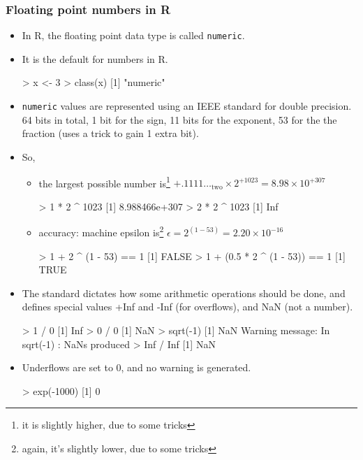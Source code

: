 \documentclass[11pt,a4paper]{article}
\begin{document}
\begin{frame}[fragile]
	\frametitle{Floating point numbers in R}

	\begin{itemize}
    \item <1->In R, the floating point data type is called \texttt{numeric}.
		\item <2->It is the default for numbers in R.
\begin{semiverbatim}
> x <- 3
> class(x)
[1] "numeric"
\end{semiverbatim}
    \item <3->\texttt{numeric} values are represented using an IEEE standard for double precision.  64 bits in total, 1 bit for the sign, 11 bits for the exponent, 53 for the the fraction (uses a trick to gain 1 extra bit).
	\end{itemize}
\end{frame}
\begin{frame}[fragile]
	\begin{itemize}
    \item So,
    \begin{itemize}
        \item <2-> the largest possible number is\footnote{it is slightly higher, due to some tricks}
         $+.1111\ldots_{\mbox{two}} \times 2^{+1023} = 8.98\times 10^{+307}$
\begin{semiverbatim}
> 1 * 2 ^ 1023
[1] 8.988466e+307
> 2 * 2 ^ 1023
[1] Inf\end{semiverbatim}
        \item <3-> accuracy: machine epsilon is\footnote{again, it's slightly lower, due to some tricks} $\epsilon = 2^{(1-53)} = 2.20\times 10^{-16}$
\begin{semiverbatim}
> 1 + 2 ^ (1 - 53) == 1
[1] FALSE
> 1 + (0.5 * 2 ^ (1 - 53)) == 1
[1] TRUE\end{semiverbatim}
    \end{itemize}
	\end{itemize}
\end{frame}
\begin{frame}[fragile]
  \begin{itemize}
    \item <1->The standard dictates how some arithmetic operations should be done, and defines special values +Inf and -Inf (for overflows), and NaN (not a number).
\begin{semiverbatim}
> 1 / 0
[1] Inf
> 0 / 0
[1] NaN
> sqrt(-1)
[1] NaN
Warning message:
In sqrt(-1) : NaNs produced
> Inf / Inf
[1] NaN
\end{semiverbatim}
    \item <2->Underflows are set to 0, and no warning is generated.
\begin{semiverbatim}
> exp(-1000)
[1] 0
\end{semiverbatim}

\end{itemize}

\end{frame}
\end{document}
